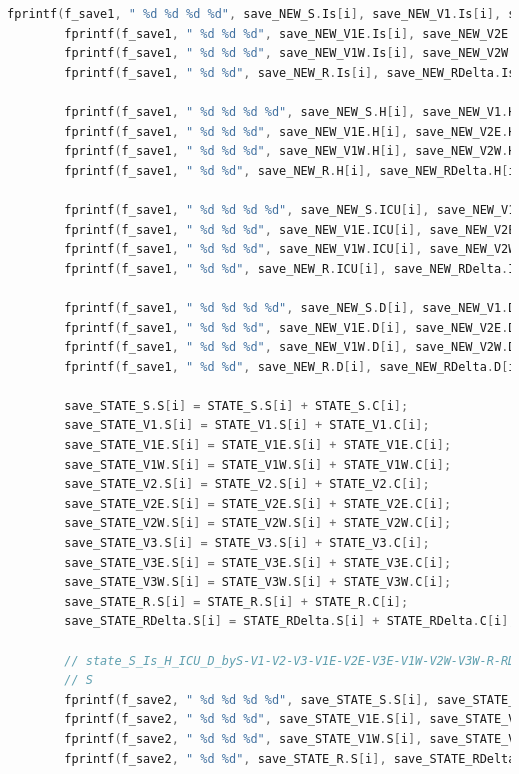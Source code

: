 \documentclass[bwprint]{gmcmthesis}
\numberwithin{figure}{section}
\begin{document}
\begin{lstlisting}[language=C]
        fprintf(f_save1, " %d %d %d %d", save_NEW_S.Is[i], save_NEW_V1.Is[i], save_NEW_V2.Is[i], save_NEW_V3.Is[i]);
        fprintf(f_save1, " %d %d %d", save_NEW_V1E.Is[i], save_NEW_V2E.Is[i], save_NEW_V3E.Is[i]);
        fprintf(f_save1, " %d %d %d", save_NEW_V1W.Is[i], save_NEW_V2W.Is[i], save_NEW_V3W.Is[i]);
        fprintf(f_save1, " %d %d", save_NEW_R.Is[i], save_NEW_RDelta.Is[i]);

        fprintf(f_save1, " %d %d %d %d", save_NEW_S.H[i], save_NEW_V1.H[i], save_NEW_V2.H[i], save_NEW_V3.H[i]);
        fprintf(f_save1, " %d %d %d", save_NEW_V1E.H[i], save_NEW_V2E.H[i], save_NEW_V3E.H[i]);
        fprintf(f_save1, " %d %d %d", save_NEW_V1W.H[i], save_NEW_V2W.H[i], save_NEW_V3W.H[i]);
        fprintf(f_save1, " %d %d", save_NEW_R.H[i], save_NEW_RDelta.H[i]);

        fprintf(f_save1, " %d %d %d %d", save_NEW_S.ICU[i], save_NEW_V1.ICU[i], save_NEW_V2.ICU[i], save_NEW_V3.ICU[i]);
        fprintf(f_save1, " %d %d %d", save_NEW_V1E.ICU[i], save_NEW_V2E.ICU[i], save_NEW_V3E.ICU[i]);
        fprintf(f_save1, " %d %d %d", save_NEW_V1W.ICU[i], save_NEW_V2W.ICU[i], save_NEW_V3W.ICU[i]);
        fprintf(f_save1, " %d %d", save_NEW_R.ICU[i], save_NEW_RDelta.ICU[i]);

        fprintf(f_save1, " %d %d %d %d", save_NEW_S.D[i], save_NEW_V1.D[i], save_NEW_V2.D[i], save_NEW_V3.D[i]);
        fprintf(f_save1, " %d %d %d", save_NEW_V1E.D[i], save_NEW_V2E.D[i], save_NEW_V3E.D[i]);
        fprintf(f_save1, " %d %d %d", save_NEW_V1W.D[i], save_NEW_V2W.D[i], save_NEW_V3W.D[i]);
        fprintf(f_save1, " %d %d", save_NEW_R.D[i], save_NEW_RDelta.D[i]);

        save_STATE_S.S[i] = STATE_S.S[i] + STATE_S.C[i];
        save_STATE_V1.S[i] = STATE_V1.S[i] + STATE_V1.C[i];
        save_STATE_V1E.S[i] = STATE_V1E.S[i] + STATE_V1E.C[i];
        save_STATE_V1W.S[i] = STATE_V1W.S[i] + STATE_V1W.C[i];
        save_STATE_V2.S[i] = STATE_V2.S[i] + STATE_V2.C[i];
        save_STATE_V2E.S[i] = STATE_V2E.S[i] + STATE_V2E.C[i];
        save_STATE_V2W.S[i] = STATE_V2W.S[i] + STATE_V2W.C[i];
        save_STATE_V3.S[i] = STATE_V3.S[i] + STATE_V3.C[i];
        save_STATE_V3E.S[i] = STATE_V3E.S[i] + STATE_V3E.C[i];
        save_STATE_V3W.S[i] = STATE_V3W.S[i] + STATE_V3W.C[i];
        save_STATE_R.S[i] = STATE_R.S[i] + STATE_R.C[i];
        save_STATE_RDelta.S[i] = STATE_RDelta.S[i] + STATE_RDelta.C[i];

        // state_S_Is_H_ICU_D_byS-V1-V2-V3-V1E-V2E-V3E-V1W-V2W-V3W-R-RDelta
        // S
        fprintf(f_save2, " %d %d %d %d", save_STATE_S.S[i], save_STATE_V1.S[i], save_STATE_V2.S[i], save_STATE_V3.S[i]);
        fprintf(f_save2, " %d %d %d", save_STATE_V1E.S[i], save_STATE_V2E.S[i], save_STATE_V3E.S[i]);
        fprintf(f_save2, " %d %d %d", save_STATE_V1W.S[i], save_STATE_V2W.S[i], save_STATE_V3W.S[i]);
        fprintf(f_save2, " %d %d", save_STATE_R.S[i], save_STATE_RDelta.S[i]);


\end{lstlisting}
\end{document}
